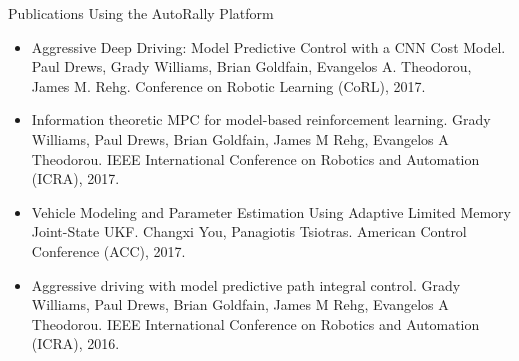 \documentclass[aspectratio=169]{beamer}
\begin{document}
\begin{frame}{Publications Using the AutoRally Platform}
\begin{multicols}{2}
\begin{itemize}
		\item Aggressive Deep Driving: Model Predictive Control with a CNN Cost Model. Paul Drews, Grady Williams, Brian Goldfain, Evangelos A. Theodorou, James M. Rehg. Conference on Robotic Learning (CoRL), 2017.
		\item Information theoretic MPC for model-based reinforcement learning. Grady Williams, Paul Drews, Brian Goldfain, James M Rehg, Evangelos A Theodorou. IEEE International Conference on Robotics and Automation (ICRA), 2017.
		\item Vehicle Modeling and Parameter Estimation Using Adaptive Limited Memory Joint-State UKF. Changxi You, Panagiotis Tsiotras. American Control Conference (ACC), 2017.
		\item Aggressive driving with model predictive path integral control. Grady Williams, Paul Drews, Brian Goldfain, James M Rehg, Evangelos A Theodorou. IEEE International Conference on Robotics and Automation (ICRA), 2016.
	\end{itemize}
\end{multicols}
\end{frame}
\end{document}

